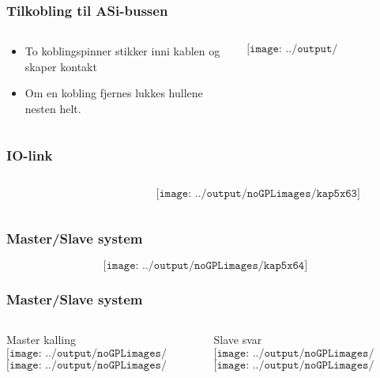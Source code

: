 \documentclass[aspectratio=169,xcolor=dvipsnames]{beamer}
\begin{document}
\begin{frame}
	\frametitle{Tilkobling til  ASi-bussen}
	\begin{columns}
		\begin{column}{0.5\textwidth}

			\begin{itemize}
				\item To koblingspinner stikker inni kablen og skaper kontakt
				\item Om en kobling fjernes lukkes hullene nesten helt. 
			\end{itemize}

			
		\end{column}

		\begin{column}{0.5\textwidth}
	$$\texttt{[image: ../output/noGPLimages/kap5x62]}$$
		\end{column}
	\end{columns}
\end{frame}
\begin{frame}
	\frametitle{IO-link}
	\begin{columns}
		\begin{column}{0.5\textwidth}


			
		\end{column}

		\begin{column}{0.5\textwidth}
	$$\texttt{[image: ../output/noGPLimages/kap5x63]}$$
		\end{column}
	\end{columns}
\end{frame}
\begin{frame}
	\frametitle{Master/Slave system}
	$$\texttt{[image: ../output/noGPLimages/kap5x64]}$$
\end{frame}
\begin{frame}
	\frametitle{Master/Slave system}
	\begin{columns}
		\begin{column}{0.5\textwidth}
\Huge Master kalling
\normalsize
	$$\texttt{[image: ../output/noGPLimages/kap5x65]}$$
	$$\texttt{[image: ../output/noGPLimages/kap5x66]}$$
			
		\end{column}

		\begin{column}{0.5\textwidth}
\Huge Slave svar
\normalsize
	$$\texttt{[image: ../output/noGPLimages/kap5x68]}$$
	$$\texttt{[image: ../output/noGPLimages/kap5x67]}$$
		\end{column}
	\end{columns}
\end{frame}
\end{document}
